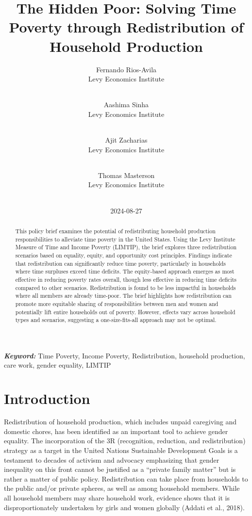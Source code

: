 \documentclass[
  11pt,
]{article}
\title{The Hidden Poor: Solving Time Poverty through Redistribution of
Household Production}
\author{
Fernando Rios-Avila\\
Levy Economics Institute\\
\\
\and 
Aashima Sinha\\
Levy Economics Institute\\
\\
\and 
Ajit Zacharias\\
Levy Economics Institute\\
\\
\and 
Thomas Masterson\\
Levy Economics Institute\\
\\
}
\date{2024-08-27}
\begin{document}
\def\spacingset#1{\renewcommand{\baselinestretch}%
{#1}\small\normalsize} \spacingset{1}


\maketitle
\begin{abstract}
This policy brief examines the potential of redistributing household
production responsibilities to alleviate time poverty in the United
States. Using the Levy Institute Measure of Time and Income Poverty
(LIMTIP), the brief explores three redistribution scenarios based on
equality, equity, and opportunity cost principles. Findings indicate
that redistribution can significantly reduce time poverty, particularly
in households where time surpluses exceed time deficits. The
equity-based approach emerges as most effective in reducing poverty
rates overall, though less effective in reducing time deficits compared
to other scenarios. Redistribution is found to be less impactful in
households where all members are already time-poor. The brief highlights
how redistribution can promote more equitable sharing of
responsibilities between men and women and potentially lift entire
households out of poverty. However, effects vary across household types
and scenarios, suggesting a one-size-fits-all approach may not be
optimal.
\end{abstract}
 
\vspace{.2in}

\textbf{\textit{Keyword: }}Time Poverty, Income Poverty, Redistribution,
household production, care work, gender equality, LIMTIP


\thispagestyle{empty}
\clearpage{}
\newpage
\spacingset{1.2} %
\section{Introduction}\label{introduction}

Redistribution of household production, which includes unpaid caregiving
and domestic chores, has been identified as an important tool to achieve
gender equality. The incorporation of the 3R (recognition, reduction,
and redistribution) strategy as a target in the United Nations
Sustainable Development Goals is a testament to decades of activism and
advocacy emphasizing that gender inequality on this front cannot be
justified as a ``private family matter'' but is rather a matter of
public policy. Redistribution can take place from households to the
public and/or private spheres, as well as among household members. While
all household members may share household work, evidence shows that it
is disproportionately undertaken by girls and women globally (Addati et
al., 2018).
\end{document}
